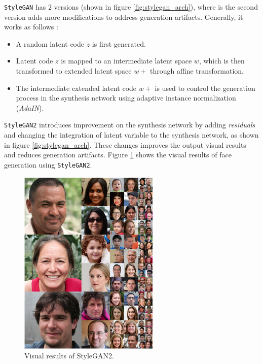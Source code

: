 \texttt{StyleGAN} has $2$ versions (shown in figure \ref{fig:stylegan_arch}), where is the second version adds more modifications to address generation artifacts. Generally, it works as follows :
\begin{itemize}
    \item A random latent code $z$ is first generated.
    \item Latent code $z$ is mapped to an intermediate latent space $w$, which is then transformed to extended latent space $w+$ through affine transformation.
    \item The intermediate extended latent code $w+$ is used to control the generation process in the synthesis network using adaptive instance normalization (\emph{AdaIN}).
\end{itemize}

\texttt{StyleGAN2} \cite{karras2020analyzing} introduces improvement on the synthesis network by adding \emph{residuals} and changing the integration of latent variable to the synthesis network, as shown in figure \ref{fig:stylegan_arch}. These changes improves the output visual results and reduces generation artifacts. Figure \ref{fig:stgan_res} shows the visual results of face generation using \texttt{StyleGAN2}.

\begin{figure}[H]
    \centering
    \includegraphics[width=0.6\textwidth]{images/stylegan-results.png}
    \caption{Visual results of StyleGAN2.}
    \label{fig:stgan_res}
\end{figure}

